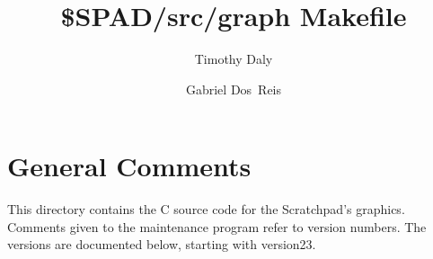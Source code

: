 \documentclass{article}
\title{\$SPAD/src/graph Makefile}
\author{Timothy Daly \and Gabriel Dos~Reis}
\begin{document}
\maketitle

\begin{abstract}
\end{abstract}
\eject

\tableofcontents
\eject

\section{General Comments}

This directory contains the C source code for the Scratchpad's
graphics. Comments given to the maintenance program refer to
version numbers. The versions are documented below, starting with
version23.
\end{document}

